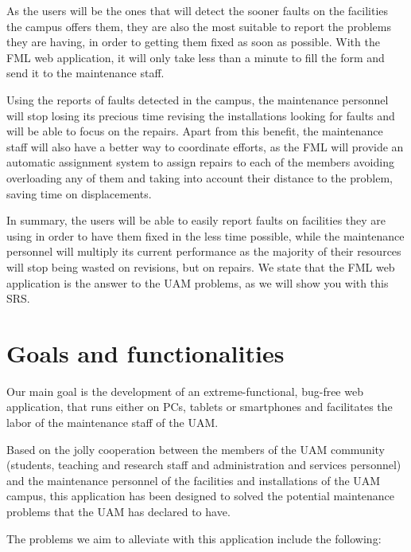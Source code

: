 \documentclass{report}
\begin{document}
As the users will be the ones that will detect the sooner faults on the facilities the campus offers them, they are also the most suitable to report the problems they are having, in order to getting them fixed as soon as possible. With the FML web application, it will only take less than a minute to fill the form and send it to the maintenance staff. 

Using the reports of faults detected in the campus, the maintenance personnel will stop losing its precious time revising the installations looking for faults and will be able to focus on the repairs. Apart from this benefit, the maintenance staff will also have a better way to coordinate efforts, as the FML will provide an automatic assignment system to assign repairs to each of the members avoiding overloading any of them and taking into account their distance to the problem, saving time on displacements.

In summary, the users will be able to easily report faults on facilities they are using in order to have them fixed in the less time possible, while the maintenance personnel will multiply its current performance as the majority of their resources will stop being wasted on revisions, but on repairs. We state that the FML web application is the answer to the UAM problems, as we will show you with this SRS.


\section{Goals and functionalities}


Our main goal is the development of an extreme-functional, bug-free web application, that runs either on PCs, tablets or smartphones and facilitates the labor of the maintenance staff of the UAM.

Based on the jolly cooperation between the members of the UAM community (students, teaching and research staff and administration and services personnel) and the maintenance personnel of the facilities and installations of the UAM campus, this application has been designed to solved the potential maintenance problems that the UAM has declared to have. 

The problems we aim to alleviate with this application include the following:
\end{document}
